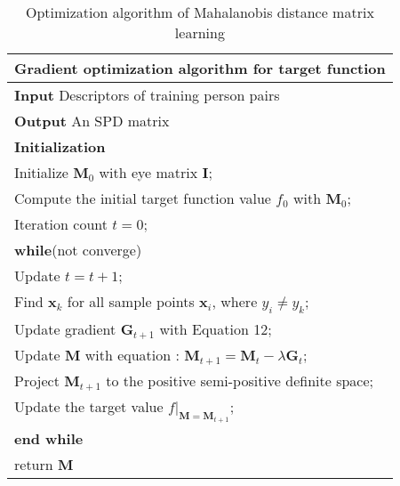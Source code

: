 \begin{table}[H]
 \centering
 \caption{Optimization algorithm of Mahalanobis distance matrix learning}
 \label{Gradientdemo}
 \begin{tabular}{l}
 \hline 
 \multicolumn{1}{l}{\textbf{Gradient optimization algorithm for target function}} \\
 \hline
 \textbf{Input} Descriptors of training person pairs \\
 \textbf{Output} An SPD matrix\\
 \textbf{Initialization} \\
 Initialize $\bm{M}_0$ with eye matrix $\bm{I}$; \\
 Compute the initial target function value $f_0$ with $\bm{M}_0$;\\
 Iteration count  $t = 0$;\\

 \textbf{while}(not converge)\\
 \hspace{0.5cm} Update $t =  t + 1$;\\
 \hspace{0.5cm}  Find $\bm{x}_k$ for all sample points $\bm{x}_i$, where $y_i \ne y_k$;\\
 \hspace{0.5cm} Update gradient $\bm{G}_{t+1}$ with Equation 12;\\
 \hspace{0.5cm}  Update $\bm{M}$ with equation : $\bm{M}_{t+1} = \bm{M}_{t} - \lambda\bm{G}_t$;\\
 \hspace{0.5cm}  Project $\bm{M}_{t+1}$ to the positive semi-positive definite space; \\ 
 \hspace{0.5cm}  Update the target value $f|_{\bm{M} = \bm{M}_{t+1}}$;\\
 \textbf{end while}  \\
 return $\bm{M}$\\
 \hline
 \end{tabular} 
 \end{table}
 
 
 
 
 
